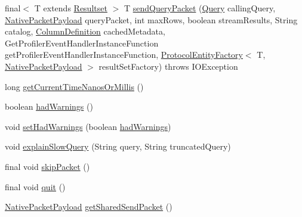 \begin{DoxyCompactItemize}
\item 
final$<$ T extends \mbox{\hyperlink{interfacecom_1_1mysql_1_1cj_1_1protocol_1_1_resultset}{Resultset}} $>$ T \mbox{\hyperlink{classcom_1_1mysql_1_1cj_1_1protocol_1_1a_1_1_native_protocol_a08597317ed6335e40dafa52f26066766}{send\+Query\+Packet}} (\mbox{\hyperlink{interfacecom_1_1mysql_1_1cj_1_1_query}{Query}} calling\+Query, \mbox{\hyperlink{classcom_1_1mysql_1_1cj_1_1protocol_1_1a_1_1_native_packet_payload}{Native\+Packet\+Payload}} query\+Packet, int max\+Rows, boolean stream\+Results, String catalog, \mbox{\hyperlink{interfacecom_1_1mysql_1_1cj_1_1protocol_1_1_column_definition}{Column\+Definition}} cached\+Metadata, Get\+Profiler\+Event\+Handler\+Instance\+Function get\+Profiler\+Event\+Handler\+Instance\+Function, \mbox{\hyperlink{interfacecom_1_1mysql_1_1cj_1_1protocol_1_1_protocol_entity_factory}{Protocol\+Entity\+Factory}}$<$ T, \mbox{\hyperlink{classcom_1_1mysql_1_1cj_1_1protocol_1_1a_1_1_native_packet_payload}{Native\+Packet\+Payload}} $>$ result\+Set\+Factory)  throws I\+O\+Exception 
\item 
long \mbox{\hyperlink{classcom_1_1mysql_1_1cj_1_1protocol_1_1a_1_1_native_protocol_a7a77ee9634831da978a24f31db0d707c}{get\+Current\+Time\+Nanos\+Or\+Millis}} ()
\item 
boolean \mbox{\hyperlink{classcom_1_1mysql_1_1cj_1_1protocol_1_1a_1_1_native_protocol_aa344264ddc21778b27e8326895ae9a7d}{had\+Warnings}} ()
\item 
void \mbox{\hyperlink{classcom_1_1mysql_1_1cj_1_1protocol_1_1a_1_1_native_protocol_ad607806214c9cd9d57d58405f324496f}{set\+Had\+Warnings}} (boolean \mbox{\hyperlink{classcom_1_1mysql_1_1cj_1_1protocol_1_1a_1_1_native_protocol_a6cb2c60a1acd72e99a1a40b162947c08}{had\+Warnings}})
\item 
void \mbox{\hyperlink{classcom_1_1mysql_1_1cj_1_1protocol_1_1a_1_1_native_protocol_a93ebc419a4b890f9567644c44f72a6a9}{explain\+Slow\+Query}} (String query, String truncated\+Query)
\item 
final void \mbox{\hyperlink{classcom_1_1mysql_1_1cj_1_1protocol_1_1a_1_1_native_protocol_ab344b89498bf035e0e8381f5999f1ead}{skip\+Packet}} ()
\item 
final void \mbox{\hyperlink{classcom_1_1mysql_1_1cj_1_1protocol_1_1a_1_1_native_protocol_a068e7a1606a75477e944516d5888ef2a}{quit}} ()
\item 
\mbox{\hyperlink{classcom_1_1mysql_1_1cj_1_1protocol_1_1a_1_1_native_packet_payload}{Native\+Packet\+Payload}} \mbox{\hyperlink{classcom_1_1mysql_1_1cj_1_1protocol_1_1a_1_1_native_protocol_a9ce262e6311a36690401851050b47899}{get\+Shared\+Send\+Packet}} ()

\end{DoxyCompactItemize}
